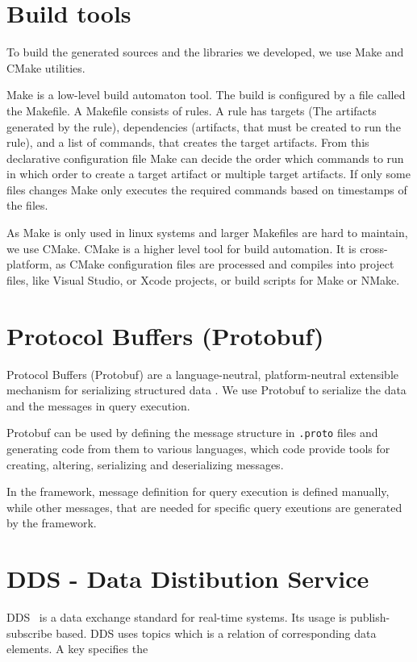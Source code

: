 \section{ Build tools }

To build the generated sources and the \cpp{} libraries we developed, we use Make and CMake utilities. 


Make is a low-level build automaton tool. 
The build is configured by a file called the Makefile.
A Makefile consists of rules. 
A rule has targets (The artifacts generated by the rule), dependencies (artifacts, that must be created to run the rule), and a list of commands, that creates the target artifacts. 
From this declarative configuration file Make can decide the order which commands to run in which order to create a target artifact or multiple target artifacts.
If only some files changes Make only executes the required commands based on timestamps of the files.

As Make is only used in linux systems and larger Makefiles are hard to maintain, we use CMake.
CMake is a higher level tool for build automation. 
It is cross-platform, as CMake configuration files are processed and compiles into project files, like Visual Studio, or Xcode projects, or build scripts for Make or NMake.


\section{Protocol Buffers (Protobuf)}
Protocol Buffers (Protobuf) are a language-neutral, platform-neutral extensible mechanism for serializing structured data \cite{protobuf}. 
We use Protobuf to serialize the data and the messages in query execution.

Protobuf can be used by defining the message structure in \texttt{.proto} files and generating code from them to various languages, which code provide tools for creating, altering, serializing and deserializing messages.

In the framework, message definition for query execution is defined manually, while other messages, that are needed for specific query exeutions are generated by the framework.


\section{DDS - Data Distibution Service}

DDS~\cite{DDS} is a data exchange standard for real-time systems. 
Its usage is publish-subscribe based.
DDS uses topics which is a relation of corresponding data elements. 
A key specifies the 

